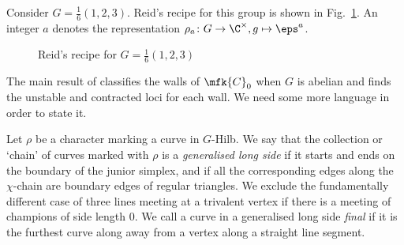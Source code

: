 \documentclass[leqno,11pt,a4paper]{amsart}
\begin{document}
\begin{example} Consider $G=\frac{1}{6}(1,2,3)$. Reid's recipe for this group is shown in Fig.~\ref{fig:1/6a}. An integer $a$ denotes the representation $\rho_a\colon G\to\C^\times,g\mapsto\eps^a$.

\begin{figure}[h]
\begin{center}
\end{center}
\caption{Reid's recipe for $G=\frac{1}{6}(1,2,3)$}
\label{fig:1/6a}
\end{figure}
\end{example}

The main result of \cite{wor_wal_20} classifies the walls of $\mfk{C}_0$ when $G$ is abelian and finds the unstable and contracted loci for each wall. We need some more language in order to state it. 

Let $\rho$ be a character marking a curve in $G$-Hilb. We say that the collection or `chain' of curves marked with $\rho$ is a \emph{generalised long side} \cite[Def.~4.12]{wor_wal_20} if it starts and ends on the boundary of the junior simplex, and if all the corresponding edges along the $\chi$-chain are boundary edges of regular triangles. We exclude the fundamentally different case of three lines meeting at a trivalent vertex if there is a meeting of champions \cite[\S2.8.2]{cr_how_02} of side length $0$. We call a curve in a generalised long side \emph{final} \cite[Def.~4.14]{wor_wal_20} if it is the furthest curve along away from a vertex along a straight line segment.
\end{document}
